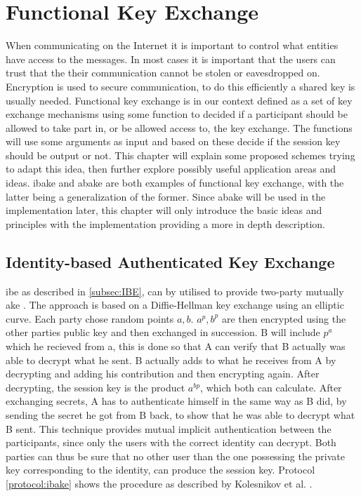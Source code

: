 \chapter{Functional Key Exchange}\label{chp:funckeyenc} 
When communicating on the Internet it is important to control what entities have access to the messages. In most cases it is important that the users can trust that the their communication cannot be stolen or eavesdropped on. Encryption is used to secure communication, to do this efficiently a shared key is usually needed. Functional key exchange is in our context defined as a set of key exchange mechanisms using some function to decided if a participant should be allowed to take part in, or be allowed access to, the key exchange. The functions will use some arguments as input and based on these decide if the session key should be output or not. This chapter will explain some proposed schemes trying to adapt this idea, then further explore possibly useful application areas and ideas. \Gls{ibake} and \gls{abake} are both examples of functional key exchange, with the latter being a generalization of the former. Since \gls{abake} will be used in the implementation later, this chapter will only introduce the basic ideas and principles with the implementation providing a more in depth description.

\section{Identity-based Authenticated Key Exchange}
\Gls{ibe} as described in \ref{subsec:IBE}, can by utilised to provide two-party mutually \gls{ake} \cite{ibake}. The approach is based on a Diffie-Hellman key exchange using an elliptic curve. Each party chose random points $a,b$. $a^p, b^p$ are then encrypted using the other parties public key and then exchanged in succession. B will include $p^a$ which he recieved from a, this is done so that A can verify that B actually was able to decrypt what he sent. B actually adds to what he receives from A by decrypting and adding his contribution and then encrypting again. After decrypting, the session key is the product $a^{bp}$, which both can calculate. After exchanging secrets, A has to authenticate himself in the same way as B did, by sending the secret he got from B back, to show that he was able to decrypt what B sent. This technique provides mutual implicit authentication between the participants, since only the users with the correct identity can decrypt. Both parties can thus be sure that no other user than the one possessing the private key corresponding to the identity, can produce the session key. Protocol \ref{protocol:ibake} shows the procedure as described by Kolesnikov et al. \cite{ibake}. 

